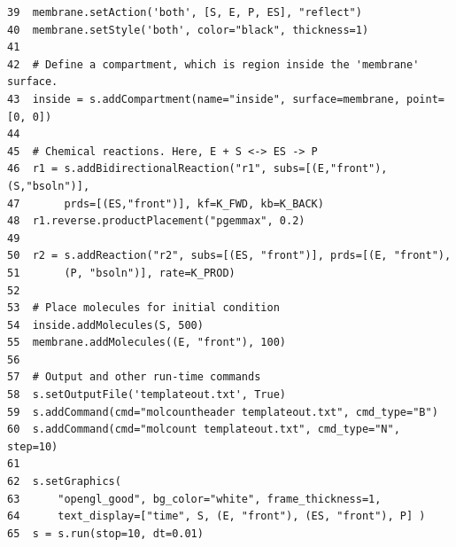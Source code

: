 \documentclass {scrbook}
\begin{document}
\begin{lstlisting}[style=SSAPython]
39  membrane.setAction('both', [S, E, P, ES], "reflect")
40  membrane.setStyle('both', color="black", thickness=1)
41
42  # Define a compartment, which is region inside the 'membrane' surface.
43  inside = s.addCompartment(name="inside", surface=membrane, point=[0, 0])
44
45  # Chemical reactions. Here, E + S <-> ES -> P
46  r1 = s.addBidirectionalReaction("r1", subs=[(E,"front"), (S,"bsoln")],
47       prds=[(ES,"front")], kf=K_FWD, kb=K_BACK)
48  r1.reverse.productPlacement("pgemmax", 0.2)
49
50  r2 = s.addReaction("r2", subs=[(ES, "front")], prds=[(E, "front"),
51       (P, "bsoln")], rate=K_PROD)
52
53  # Place molecules for initial condition
54  inside.addMolecules(S, 500)
55  membrane.addMolecules((E, "front"), 100)
56
57  # Output and other run-time commands
58  s.setOutputFile('templateout.txt', True)
59  s.addCommand(cmd="molcountheader templateout.txt", cmd_type="B")
60  s.addCommand(cmd="molcount templateout.txt", cmd_type="N", step=10)
61
62  s.setGraphics(
63      "opengl_good", bg_color="white", frame_thickness=1,
64      text_display=["time", S, (E, "front"), (ES, "front"), P] )
65  s = s.run(stop=10, dt=0.01)
\end{lstlisting}
\end{document}
